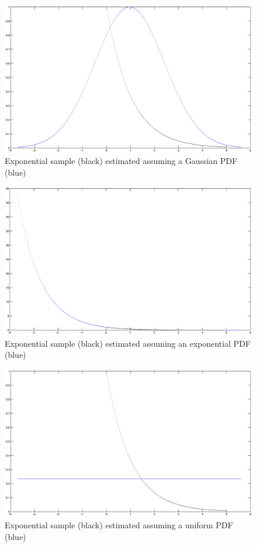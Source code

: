 \begin{figure}
\includegraphics[scale=0.4]{exp-gauss}
\caption{Exponential sample (black) estimated assuming a Gaussian PDF
(blue)}
\label{fig:eg}
\end{figure}

\begin{figure}
\includegraphics[scale=0.4]{exp-exp}
\caption{Exponential sample (black) estimated assuming an exponential PDF
(blue)}
\label{fig:ee}
\end{figure}

\begin{figure}
\includegraphics[scale=0.4]{exp-uni}
\caption{Exponential sample (black) estimated assuming a uniform PDF
(blue)}
\label{fig:eu}
\end{figure}

